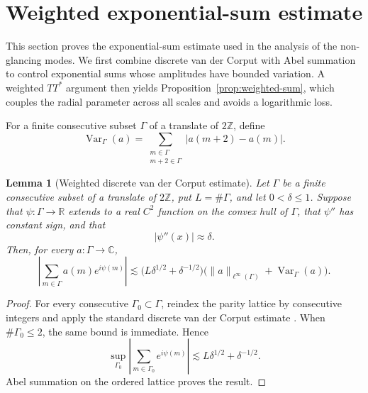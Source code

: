\documentclass[10pt,a4paper]{amsart}
\newtheorem{lemma}[theorem]{Lemma}
\numberwithin{equation}{section}
\newcommand{\norm}[1]{\lVert #1\rVert}
\begin{document}
\section{Weighted exponential-sum estimate}\label{sec:weighted}

This section proves the exponential-sum estimate used in the analysis of the
non-glancing modes. We first combine discrete van der Corput with Abel
summation to control exponential sums whose amplitudes have bounded variation.
A weighted $TT^*$ argument then yields Proposition~\ref{prop:weighted-sum},
which couples the radial parameter across all scales and avoids a logarithmic
loss. 

For a finite consecutive
subset \(\Gamma\) of a translate of \(2\mathbb Z\), define
\[
 \operatorname{Var}_\Gamma(a)
 =\sum_{\substack{m\in\Gamma\\m+2\in\Gamma}}|a(m+2)-a(m)|.
\]

\begin{lemma}[Weighted discrete van der Corput estimate]
\label{lem:discrete-vdc}
Let \(\Gamma\) be a finite consecutive subset of a translate of
\(2\mathbb Z\), put \(L=\#\Gamma\), and let \(0<\delta\le1\). Suppose that
\(\psi:\Gamma\to\mathbb R\) extends to a real \(C^2\) function on the convex
hull of \(\Gamma\), that \(\psi''\) has constant sign, and that
\[
 |\psi''(x)|\approx\delta.
\]
Then, for every \(a:\Gamma\to\mathbb C\),
\[
 \left|\sum_{m\in\Gamma}a(m)e^{i\psi(m)}\right|
 \lesssim\bigl(L\delta^{1/2}+\delta^{-1/2}\bigr)
 \bigl(\norm a_{\ell^\infty(\Gamma)}+\operatorname{Var}_\Gamma(a)\bigr).
\]
\end{lemma}

\begin{proof}
For every consecutive \(\Gamma_0\subset\Gamma\), reindex the parity lattice by
consecutive integers and apply the standard discrete van der Corput estimate
\cite[Chapter~2, Theorem~2.2]{GrahamKolesnik}. When
\(\#\Gamma_0\le2\), the same bound is immediate. Hence
\[
 \sup_{\Gamma_0}
 \left|\sum_{m\in\Gamma_0}e^{i\psi(m)}\right|
 \lesssim L\delta^{1/2}+\delta^{-1/2}.
\]
Abel summation on the ordered lattice proves the result.
\end{proof}
\end{document}
